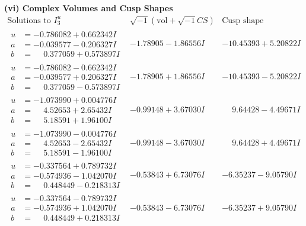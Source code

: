 \documentclass[1p]{elsarticle_modified}
\theoremstyle{definition}
\newcommand{\I}{\sqrt{-1}}
\begin{document}
\newpage\flushleft \textbf{(vi) Complex Volumes and Cusp Shapes}
$$\begin{array}{c|c|c}  
\text{Solutions to }I^u_{3}& \I (\text{vol} + \sqrt{-1}CS) & \text{Cusp shape}\\
 \hline 
\begin{aligned}
u &= -0.786082 + 0.662342 I \\
a &= -0.039577 - 0.206327 I \\
b &= \phantom{-}0.377059 + 0.573897 I\end{aligned}
 & -1.78905 - 1.86556 I & -10.45393 + 5.20822 I \\ \hline\begin{aligned}
u &= -0.786082 - 0.662342 I \\
a &= -0.039577 + 0.206327 I \\
b &= \phantom{-}0.377059 - 0.573897 I\end{aligned}
 & -1.78905 + 1.86556 I & -10.45393 - 5.20822 I \\ \hline\begin{aligned}
u &= -1.073990 + 0.004776 I \\
a &= \phantom{-}4.52653 + 2.65432 I \\
b &= \phantom{-}5.18591 + 1.96100 I\end{aligned}
 & -0.99148 + 3.67030 I & \phantom{-}9.64428 - 4.49671 I \\ \hline\begin{aligned}
u &= -1.073990 - 0.004776 I \\
a &= \phantom{-}4.52653 - 2.65432 I \\
b &= \phantom{-}5.18591 - 1.96100 I\end{aligned}
 & -0.99148 - 3.67030 I & \phantom{-}9.64428 + 4.49671 I \\ \hline\begin{aligned}
u &= -0.337564 + 0.789732 I \\
a &= -0.574936 - 1.042070 I \\
b &= \phantom{-}0.448449 - 0.218313 I\end{aligned}
 & -0.53843 + 6.73076 I & -6.35237 - 9.05790 I \\ \hline\begin{aligned}
u &= -0.337564 - 0.789732 I \\
a &= -0.574936 + 1.042070 I \\
b &= \phantom{-}0.448449 + 0.218313 I\end{aligned}
 & -0.53843 - 6.73076 I & -6.35237 + 9.05790 I \\ \hline\begin{aligned}

\end{aligned}
\end{array}$$
\end{document}
